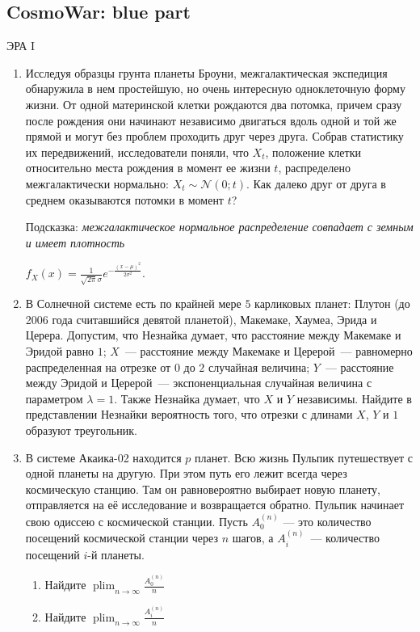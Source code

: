 \documentclass[12pt, a4paper]{article}\usepackage[]{graphicx}\usepackage[]{color}
\DeclareMathOperator*\plim{plim}
\begin{document}
\subsection{CosmoWar: blue part}

\begin{center}
ЭРА I
\end{center}

\begin{enumerate}
\item Исследуя образцы грунта планеты Броуни, межгалактическая экспедиция обнаружила в нем простейшую, но очень интересную одноклеточную форму жизни. От одной материнской клетки рождаются два потомка, причем сразу после рождения они начинают независимо двигаться вдоль одной и той же прямой и могут без проблем проходить друг через друга. Собрав статистику их передвижений, исследователи поняли, что $X_t$, положение клетки относительно места рождения в момент ее жизни $t$, распределено межгалактически нормально: $X_t\sim \mathcal{N}(0; t)$. Как далеко друг от друга в среднем оказываются потомки в момент $t$?


Подсказка: \textit{межгалактическое нормальное распределение совпадает с земным и имеет плотность}

$f_X(x) = \frac{1}{\sqrt{2\pi}\sigma}e^{-\frac{(x-\mu)^2}{2\sigma^2}}$.

\item В Солнечной системе есть по крайней мере $5$ карликовых планет: Плутон (до 2006 года считавшийся девятой планетой), Макемаке, Хаумеа, Эрида и Церера. Допустим, что Незнайка думает, что расстояние между Макемаке и Эридой равно $1$;  $X$~--- расстояние между Макемаке и Церерой~--- равномерно распределенная на отрезке от $0$ до $2$ случайная величина; $Y$~--- расстояние между Эридой и Церерой~--- экспоненциальная случайная величина с параметром $\lambda = 1$. Также Незнайка думает, что $X$ и $Y$ независимы. Найдите в представлении Незнайки вероятность того, что отрезки с длинами $X$, $Y$ и $1$ образуют треугольник.

\item  В системе Акаика-02 находится $p$ планет. Всю жизнь Пульпик путешествует с одной планеты на другую. При этом путь его лежит всегда через космическую станцию. Там он равновероятно выбирает новую планету, отправляется на её исследование и возвращается обратно. Пульпик начинает свою одиссею с космической станции. Пусть $A_0^{(n)}$ — это количество посещений космической станции через $n$ шагов, а $A_i^{(n)}$~--- количество посещений $i$-й планеты.

\begin{enumerate}
\item Найдите $\plim_{n \rightarrow \infty} \frac{A_0^{(n)}}{n}$
\item Найдите $\plim_{n \rightarrow \infty} \frac{A_i^{(n)}}{n}$
\end{enumerate}


\end{enumerate}
\end{document}

